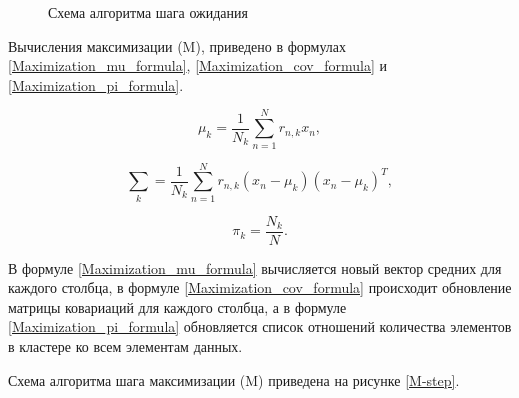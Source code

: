 \begin{figure}[H]
	\caption{Схема алгоритма шага ожидания}
	\label{E-step}
\end{figure}

Вычисления максимизации (M), приведено в формулах \ref{Maximization_mu_formula}, \ref{Maximization_cov_formula} и \ref{Maximization_pi_formula}.

\begin{equation}
\label{Maximization_mu_formula}
\mu_k = \frac{1}{N_k}\sum_{n=1}^{N}r_{n,k}x_n,
\end{equation}

\begin{equation}
\label{Maximization_cov_formula}
\sum_k = \frac{1}{N_k}\sum_{n=1}^{N}r_{n,k}(x_n - \mu_k)(x_n - \mu_k)^T,
\end{equation}

\begin{equation}
\label{Maximization_pi_formula}
\pi_k = \frac{N_k}{N}.
\end{equation}

В формуле \ref{Maximization_mu_formula} вычисляется новый вектор средних для каждого столбца, в формуле \ref{Maximization_cov_formula} происходит обновление матрицы ковариаций для каждого столбца, а в формуле \ref{Maximization_pi_formula} обновляется список отношений количества элементов в кластере ко всем элементам данных.

Схема алгоритма шага максимизации (M) приведена на рисунке \ref{M-step}.

